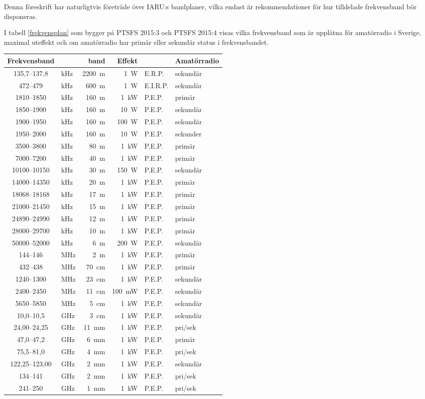 Denna föreskrift har naturligtvis företräde över IARU:s bandplaner, vilka
endast är rekommendationer för hur tilldelade frekvensband bör disponeras.

I tabell \ref{frekvensplan} som bygger på PTSFS 2015:3 och PTSFS 2015:4 visas
vilka frekvensband som är upplåtna för amatörradio i Sverige, maximal uteffekt
och om amatörradio har primär eller sekundär status i frekvensbandet.

\begin{table*}[ht]
\begin{tabular}{clr|rl|l}
Frekvensband &  & band & Effekt & & Amatörradio\\ \hline
135,7--137,8 & kHz & 2200~m & 1~W & E.R.P. & sekundär\\
472--479 & kHz & 600~m & 1~W & E.I.R.P. & sekundär\\
1810--1850 & kHz & 160~m & 1~kW & P.E.P. & primär\\
1850--1900 & kHz & 160~m & 10~W & P.E.P. & sekundär\\
1900--1950 & kHz & 160~m & 100~W & P.E.P. & sekundär\\
1950--2000 & kHz & 160~m & 10~W & P.E.P. & sekunder\\
3500--3800 & kHz & 80~m  & 1~kW & P.E.P. & primär\\
7000--7200 & kHz & 40~m  & 1~kW & P.E.P. & primär\\
10100--10150 & kHz & 30~m & 150~W & P.E.P. & sekundär\\
14000--14350 & kHz & 20~m & 1~kW & P.E.P. & primär\\
18068--18168 & kHz & 17~m & 1~kW & P.E.P. & primär\\
21000--21450 & kHz & 15~m & 1~kW & P.E.P. & primär\\
24890--24990 & kHz & 12~m & 1~kW & P.E.P. & primär\\
28000--29700 & kHz & 10~m & 1~kW & P.E.P. & primär\\
50000--52000 & kHz & 6~m & 200~W & P.E.P. & sekundär\\ \hline
144--146 & MHz & 2~m & 1~kW & P.E.P. & primär\\
432--438 & MHz & 70~cm & 1~kW & P.E.P. & primär\\
1240--1300 & MHz & 23~cm & 1~kW & P.E.P. & sekundär\\
2400--2450 & MHz & 11~cm & 100~mW & P.E.P. & sekundär\\
5650--5850 & MHz & 5~cm & 1~kW & P.E.P. & sekundär\\
10,0--10,5 & GHz & 3~cm & 1~kW & P.E.P. & sekundär\\
24,00--24,25 & GHz & 11~mm & 1~kW & P.E.P. & pri/sek\\
47,0--47,2 & GHz & 6~mm & 1~kW & P.E.P. & primär\\
75,5--81,0 & GHz & 4~mm & 1~kW & P.E.P. & pri/sek\\
122,25--123,00 & GHz & 2~mm & 1~kW & P.E.P. & sekundär\\
134--141 & GHz & 2~mm & 1~kW & P.E.P. & pri/sek\\
241--250 & GHz & 1~mm & 1~kW & P.E.P. & pri/sek\\
\end{tabular}
\caption{Frekvensband för amatörradio i Sverige}
\label{frekvensplan}
\end{table*}
